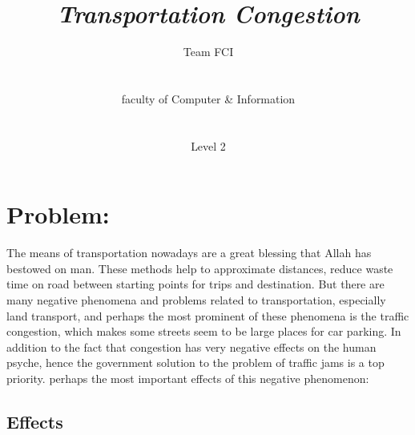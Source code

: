 \documentclass{article}
\title{\Huge {\textbf{\textit{\emph{Transportation Congestion}}}}}
\date{}
\author{\huge{Team FCI }\\\\\\  \huge{faculty of Computer \& Information} \\\\\\  \huge{Level 2}}
\begin{document}
\maketitle
\newpage
\section{Problem:} 
 The means of transportation nowadays are a great blessing that Allah has bestowed on man. These methods help to approximate distances, reduce waste time on road between starting points for trips and destination. But there are many negative phenomena and problems related to transportation, especially land transport, and perhaps the most prominent of these phenomena is the traffic congestion, which makes some streets seem to be large places for car parking. In addition to the fact that congestion has very negative effects on the human psyche, hence the government solution to the
problem of traffic jams is a top priority. perhaps the most important effects of this negative phenomenon:
\subsection{Effects}
 
\end{document}

